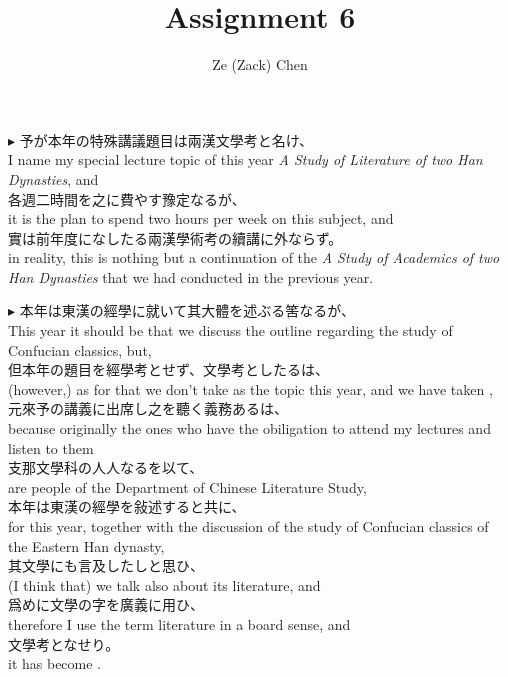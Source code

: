 \documentclass{ctexart}
\title{Assignment 6}
\author{Ze (Zack) Chen}
\makeatletter
\newcommand*{\shifttext}[1]{%
  \settowidth{\@tempdima}{#1}%
  \hspace{-\@tempdima}#1%
}
\newcommand{\plabel}[1]{%
\shifttext{\textbf{#1}\quad}%
}
\makeatother
\begin{document}
\maketitle

\plabel{$\blacktriangleright$}%
予が本年の特殊講議題目は兩漢文學考と名け、\\
I name my special lecture topic of this year \textit{A Study of Literature of two Han Dynasties}, and\\
各週二時間を之に費やす豫定なるが、\\
it is the plan to spend two hours per week on this subject, and\\
實は前年度になしたる兩漢學術考の續講に外ならず。\\
in reality, this is nothing but a continuation of the \textit{A Study of Academics of two Han Dynasties} that we had conducted in the previous year.

\vspace{1em}
\plabel{$\blacktriangleright$}%
本年は東漢の經學に就いて其大體を述ぶる筈なるが、\\
This year it should be that we discuss the outline regarding the study of Confucian classics, but,\\
但本年の題目を經學考とせず、文學考としたるは、\\
(however,) as for that we don't take  as the topic this year, and we have taken ,\\
元來予の講義に出席し之を聽く義務あるは、\\
because originally the ones who have the obiligation to attend my lectures and listen to them\\
支那文學科の人人なるを以て、\\
are people of the Department of Chinese Literature Study,\\
本年は東漢の經學を敍述すると共に、\\
for this year, together with the discussion of the study of Confucian classics of the Eastern Han dynasty,\\
其文學にも言及したしと思ひ、\\
(I think that) we talk also about its literature, and\\
爲めに文學の字を廣義に用ひ、\\
therefore I use the term literature in a board sense, and\\
文學考となせり。\\
it has become .
\end{document}
